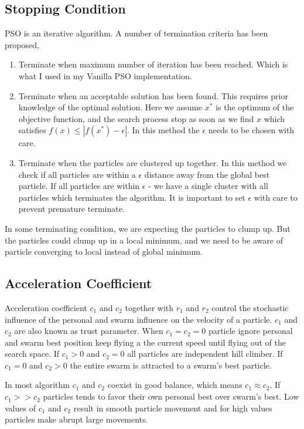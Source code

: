 \documentclass{article}
\begin{document}
\subsection{Stopping Condition}
PSO is an iterative algorithm. A number of termination criteria has been proposed,
\begin{enumerate}
    \item Terminate when maximum number of iteration has been reached. Which is what I used in my Vanilla PSO implementation.
    \item Terminate when an acceptable solution has been found. This requires prior knowledge of the optimal solution. Here we assume $x^*$ is the optimum of the objective function, and the search process stop as soon as we find $x$ which satisfies $f(x) \le |f(x^*) - \epsilon|$. In this method the $\epsilon$ needs to be chosen with care.
    \item Terminate when the particles are clustered up together. In this method we check if all particles are within a $\epsilon$ distance away from the global best particle. If all particles are within $\epsilon$ - we have a single cluster with all particles which terminates the algorithm. It is important to set $\epsilon$ with care to prevent premature terminate.
\end{enumerate}
In some terminating condition, we are expecting the particles to clump up. But the particles could clump up in a local minimum, and we need to be aware of particle converging to local instead of global minimum.



\subsection{Acceleration Coefficient}
Acceleration coefficient $c_1$ and $c_2$ together with $r_1$ and $r_2$ control the stochastic influence of the personal and swarm influence on the velocity of a particle. $c_1$ and $c_2$ are also known as trust parameter. When $c_1 = c_2 = 0$ particle ignore personal and swarm best position keep flying a the current speed until flying out of the search space. If $c_1 > 0$ and $c_2 = 0$ all particles are independent hill climber. If $c_1=0$ and $c_2 > 0$ the entire swarm is attracted to a swarm's best particle.

In most algorithm $c_1$ and $c_2$ coexist in good balance, which means $c_1 \approx c_2$. If $c_1 >> c_2$ particles tends to favor their own personal best over swarm's best. Low values of $c_1$ and $c_2$ result in smooth particle movement and for high values particles make abrupt large movements.
\end{document}
